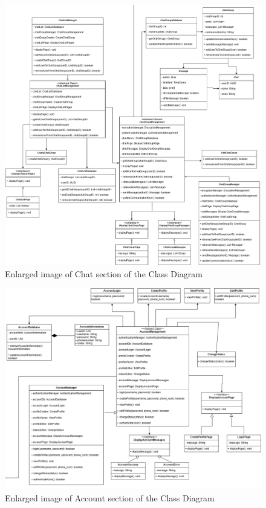 \documentclass[]{article}
\begin{document}
\renewcommand{\thefigure}{4.1.\arabic{figure}}
\setcounter{figure}{0}
\begin{figure}[H]
	\centering
	\includegraphics[width=1\textwidth]{chat-class-diagram.png}
	\caption{Enlarged image of Chat section of the Class Diagram}
	\label{fig:class-diagram}
\end{figure}

\begin{figure}[H]
	\centering
	\includegraphics[width=1\textwidth]{account-class-diagram.png}
	\caption{Enlarged image of Account section of the Class Diagram}
	\label{fig:class-diagram}
\end{figure}
\end{document}
